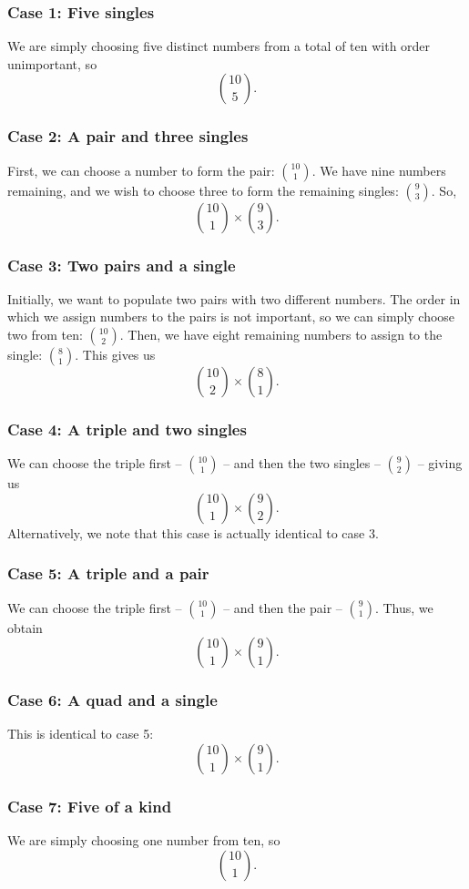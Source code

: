 \documentclass[a4paper,11pt]{article}
\begin{document}
\subsubsection*{Case 1: Five singles}
We are simply choosing five distinct numbers from a total of ten with order unimportant, so
$$
\binom{10}{5}.
$$

\subsubsection*{Case 2: A pair and three singles}
First, we can choose a number to form the pair: $\binom{10}{1}$. We have nine numbers remaining, and we wish to choose three to form the remaining singles: $\binom{9}{3}$. So,
$$
\binom{10}{1}\times\binom{9}{3}.
$$

\subsubsection*{Case 3: Two pairs and a single}
Initially, we want to populate two pairs with two different numbers. The order in which we assign numbers to the pairs is not important, so we can simply choose two from ten: $\binom{10}{2}$. Then, we have eight remaining numbers to assign to the single: $\binom{8}{1}$. This gives us
$$
\binom{10}{2}\times\binom{8}{1}.
$$

\subsubsection*{Case 4: A triple and two singles}
We can choose the triple first -- $\binom{10}{1}$ -- and then the two singles -- $\binom{9}{2}$ -- giving us
$$
\binom{10}{1}\times\binom{9}{2}.
$$
\noindent Alternatively, we note that this case is actually identical to case 3.

\subsubsection*{Case 5: A triple and a pair}
We can choose the triple first -- $\binom{10}{1}$ -- and then the pair -- $\binom{9}{1}$. Thus, we obtain
$$
\binom{10}{1}\times\binom{9}{1}.
$$

\subsubsection*{Case 6: A quad and a single}
This is identical to case 5:
$$
\binom{10}{1}\times\binom{9}{1}.
$$

\subsubsection*{Case 7: Five of a kind}
We are simply choosing one number from ten, so 
$$
\binom{10}{1}.
$$
\end{document}
